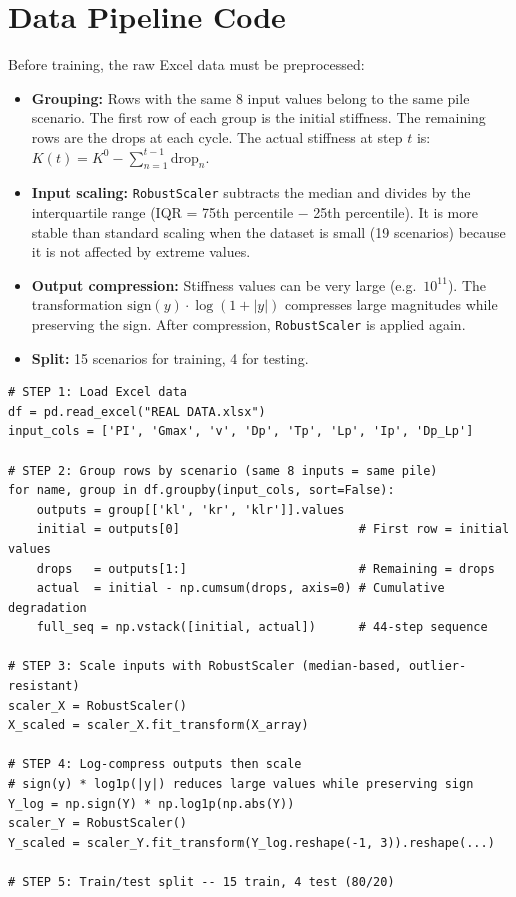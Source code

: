 \documentclass[11pt,a4paper]{article}
\begin{document}
\newpage
\section{Data Pipeline Code}

Before training, the raw Excel data must be preprocessed:
\begin{itemize}[nosep]
    \item \textbf{Grouping:} Rows with the same 8 input values belong to the same pile scenario. The first row of each group is the initial stiffness. The remaining rows are the drops at each cycle. The actual stiffness at step $t$ is: $K(t) = K^0 - \sum_{n=1}^{t-1} \text{drop}_n$.
    \item \textbf{Input scaling:} \texttt{RobustScaler} subtracts the median and divides by the interquartile range (IQR = 75th percentile $-$ 25th percentile). It is more stable than standard scaling when the dataset is small (19 scenarios) because it is not affected by extreme values.
    \item \textbf{Output compression:} Stiffness values can be very large (e.g.\ $10^{11}$). The transformation $\text{sign}(y) \cdot \log(1 + |y|)$ compresses large magnitudes while preserving the sign. After compression, \texttt{RobustScaler} is applied again.
    \item \textbf{Split:} 15 scenarios for training, 4 for testing.
\end{itemize}

\begin{lstlisting}
# STEP 1: Load Excel data
df = pd.read_excel("REAL DATA.xlsx")
input_cols = ['PI', 'Gmax', 'v', 'Dp', 'Tp', 'Lp', 'Ip', 'Dp_Lp']

# STEP 2: Group rows by scenario (same 8 inputs = same pile)
for name, group in df.groupby(input_cols, sort=False):
    outputs = group[['kl', 'kr', 'klr']].values
    initial = outputs[0]                         # First row = initial values
    drops   = outputs[1:]                        # Remaining = drops
    actual  = initial - np.cumsum(drops, axis=0) # Cumulative degradation
    full_seq = np.vstack([initial, actual])      # 44-step sequence

# STEP 3: Scale inputs with RobustScaler (median-based, outlier-resistant)
scaler_X = RobustScaler()
X_scaled = scaler_X.fit_transform(X_array)

# STEP 4: Log-compress outputs then scale
# sign(y) * log1p(|y|) reduces large values while preserving sign
Y_log = np.sign(Y) * np.log1p(np.abs(Y))
scaler_Y = RobustScaler()
Y_scaled = scaler_Y.fit_transform(Y_log.reshape(-1, 3)).reshape(...)

# STEP 5: Train/test split -- 15 train, 4 test (80/20)
\end{lstlisting}
\end{document}
